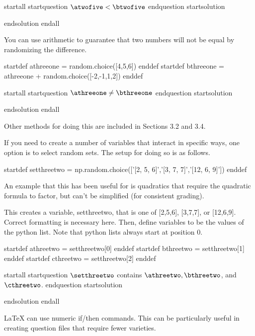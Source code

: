 startall
startquestion $\atwofive < \btwofive$ endquestion
startsolution \item  endsolution
endall






You can use arithmetic to guarantee that two numbers will not be equal by randomizing the difference.

startdef athreeone = random.choice([4,5,6]) enddef
startdef bthreeone = athreeone + random.choice([-2,-1,1,2]) enddef

startall
startquestion $\athreeone \neq \bthreeone$ endquestion
startsolution \item  endsolution
endall

Other methods for doing this are included in Sections 3.2 and 3.4.




If you need to create a number of variables that interact in specific ways, one option is to select random sets. The setup for doing so is as follows.

startdef setthreetwo = np.random.choice(['[2, 5, 6]','[3, 7, 7]','[12, 6, 9]']) enddef 

An example that this has been useful for is quadratics that require the quadratic formula to factor, but can't be simplified (for consistent grading).

This creates a variable, setthreetwo, that is one of [2,5,6], [3,7,7], or [12,6,9]. Correct formatting is necessary here. Then, define variables to be the values of the python list. Note that python lists always start at position 0.

startdef athreetwo = setthreetwo[0] enddef
startdef bthreetwo = setthreetwo[1] enddef
startdef cthreetwo = setthreetwo[2] enddef

startall
startquestion $\setthreetwo$ contains $\athreetwo,\bthreetwo$, and $\cthreetwo$. endquestion
startsolution \item  endsolution
endall




LaTeX can use numeric if/then commands. This can be particularly useful in creating question files that require fewer varieties. 

